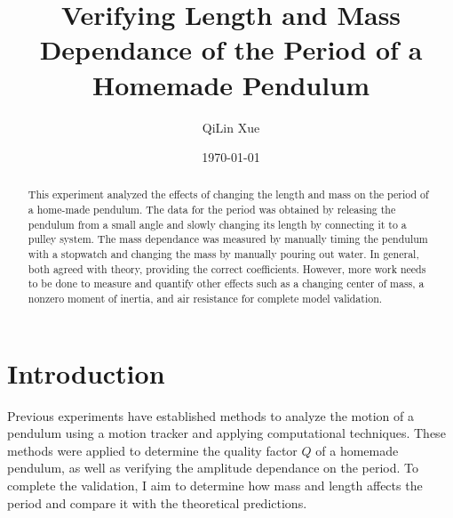 \documentclass[%
 reprint,
 amsmath,amssymb
 aps,
]{revtex4-2}
\begin{document}

\title{Verifying Length and Mass Dependance of the Period of a Homemade Pendulum}%

\author{QiLin Xue}

\date{\today}%

\begin{abstract}
This experiment analyzed the effects of changing the length and mass on the period of a home-made pendulum. The data for the period was obtained by releasing the pendulum from a small angle and slowly changing its length by connecting it to a pulley system. The mass dependance was measured by manually timing the pendulum with a stopwatch and changing the mass by manually pouring out water. In general, both agreed with theory, providing the correct coefficients. However, more work needs to be done to measure and quantify other effects such as a changing center of mass, a nonzero moment of inertia, and air resistance for complete model validation.
\end{abstract}

\maketitle

\section{Introduction}
Previous experiments have established methods to analyze the motion of a pendulum using a motion tracker and applying computational techniques. These methods were applied to determine the quality factor $Q$ of a homemade pendulum, as well as verifying the amplitude dependance on the period. To complete the validation, I aim to determine how mass and length affects the period and compare it with the theoretical predictions.
\end{document}
